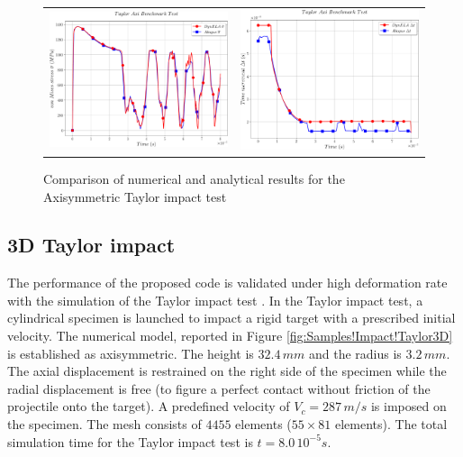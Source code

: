 \begin{figure}[h]
\begin{centering}
\begin{tabular}{cc}
\includegraphics[width=0.45\columnwidth]{Figures/Samples/Impact/Taylor-Axi_vonMises} & \includegraphics[width=0.45\columnwidth]{Figures/Samples/Impact/Taylor-Axi_timeStep}\tabularnewline
\end{tabular}
\par\end{centering}
\caption{Comparison of numerical and analytical results for the Axisymmetric
Taylor impact test\label{fig:Samples!Impact!TaylorAxi-comparison}}
\end{figure}


\subsection{3D Taylor impact}

The performance of the proposed code is validated under high deformation
rate with the simulation of the Taylor impact test \cite{taylor1946james}.
In the Taylor impact test, a cylindrical specimen is launched to impact
a rigid target with a prescribed initial velocity. The numerical model,
reported in Figure \ref{fig:Samples!Impact!Taylor3D} is established
as axisymmetric. The height is $32.4\,mm$ and the radius is $3.2\,mm$.
The axial displacement is restrained on the right side of the specimen
while the radial displacement is free (to figure a perfect contact
without friction of the projectile onto the target). A predefined
velocity of $V_{c}=287\,m/s$ is imposed on the specimen. The mesh
consists of $4455$ elements ($55\times81$ elements). The total simulation
time for the Taylor impact test is $t=8.0\,10^{-5}s$.

